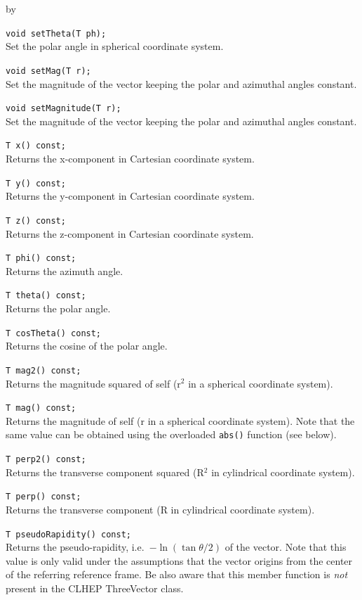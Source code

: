 \documentclass[twoside]{article}
\newcommand{\comp}[1]{\texttt{#1}}%
\newcommand{\entrylabel}[1]{\mbox{\textbf{{#1}}}\hfil}%
\newenvironment{entry}
{\begin{list}{}%
    {\renewcommand{\makelabel}{\entrylabel}%
     \setlength{\labelwidth}{90pt}%
     \setlength{\leftmargin}{\labelwidth}
     \advance\leftmargin by \labelsep%
      }%
    }%
  {\end{list}}
\newcommand{\Entrylabel}[1]%
{\raisebox{0pt}[1ex][0pt]{\makebox[\labelwidth][l]%
    {\parbox[t]{\labelwidth}{\hspace{0pt}\textbf{{#1}}}}}}
\newenvironment{Entry}%
{\renewcommand{\entrylabel}{\Entrylabel}\begin{entry}}%
  {\end{entry}}
\begin{document}
\begin{Entry}
    \verb+void setTheta(T ph);+\\
    Set the polar angle in spherical coordinate system.

    \verb+void setMag(T r);+\\
    Set the magnitude of the vector keeping the polar and azimuthal
    angles constant.

    \verb+void setMagnitude(T r);+\\
    Set the magnitude of the vector keeping the polar and azimuthal
    angles constant.
    
    \verb+T x() const;+\\
    Returns the x-component in Cartesian coordinate system.
    
    \verb+T y() const;+\\
    Returns the y-component in Cartesian coordinate system.
    
    \verb+T z() const;+\\
    Returns the z-component in Cartesian coordinate system.
    
    \verb+T phi() const;+\\
    Returns the azimuth angle.
    
    \verb+T theta() const;+\\
    Returns the polar angle.
    
    \verb+T cosTheta() const;+\\
    Returns the cosine of the polar angle.
    
    \verb+T mag2() const;+\\
    Returns the magnitude squared of self (r$^2$ in a spherical coordinate system).
    
    \verb+T mag() const;+\\
    Returns the magnitude of self (r in a spherical coordinate system).
    Note that the same value can be obtained using the overloaded
    \comp{abs()} function (see below). 
    
    \verb+T perp2() const;+\\
    Returns the transverse component squared
    (R$^2$ in cylindrical coordinate system).
    
    \verb+T perp() const;+\\
    Returns the transverse component
    (R in cylindrical coordinate system). 
    
    \verb+T pseudoRapidity() const;+\\
    Returns the pseudo-rapidity, i.e.~$-\ln(\tan \theta/2)$ of the
    vector. Note that this value is only valid under the assumptions
    that the vector origins from the center of the referring
    reference frame. Be also aware that this member function is
    {\em not} present in the CLHEP ThreeVector class.
    

\end{Entry}
\end{document}
